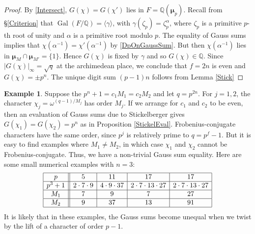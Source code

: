 \documentclass[12pt]{amsart}  \usepackage{amsmath,amssymb,enumerate,amscd,tikz,url}
\numberwithin{equation}{section}
\theoremstyle{definition}
\newtheorem{Ex}[equation]{Example}
\newcommand{\Q}{{\mathbb Q}}
\newcommand{\Mu}{\boldsymbol \mu}
\newcommand{\Gal}{\operatorname{Gal}}
\newcommand{\lr}[1]{{\langle {#1} \rangle}}
\newcommand{\vv}[1]{{\left\vert {#1} \right\vert}}
\begin{document}
\begin{proof}
By \eqref{Intersect}, $G(\chi) = G(\chi')$ lies in $F = \Q(\Mu_p)$.  Recall from \S \ref{Criterion} that $\Gal(F/\Q) =  \lr{\gamma}$, with $\gamma(\zeta_p) = \zeta_p^\alpha$, where $\zeta_p$ is a primitive $p$-th root of unity and $\alpha$ is a primitive root modulo $p$.  The equality of Gauss sums implies that $\chi(\alpha^{-1}) = \chi'(\alpha^{-1})$ by \eqref{DpOnGaussSum}.  But then $\chi(\alpha^{-1})$ lies in $\Mu_M \cap \Mu_{M'} = \{1\}$.  Hence $G(\chi)$ is fixed by $\gamma$ and so $G(\chi) \in \Q$.  Since $\vv{G(\chi)}_\infty = \sqrt{q}$ at the archimedean place, we conclude that $f = 2n$ is even and $G(\chi) = \pm p^n$.  The unique digit sum $(p-1)n$ follows from Lemma \ref{Stick}
\end{proof}

\begin{Ex}
Suppose the $p^n + 1 = c_1 M_1 = c_2 M_2$ and let $q = p^{2n}$.  For $j = 1,2$, the character $\chi_j = \omega^{(q-1)/M_j}$ has order $M_j$.  If we arrange for $c_1$ and $c_2$ to be even, then an evaluation of Gauss sums due to Stickelberger gives $G(\chi_1) = G(\chi_2) = p^n$ as in Proposition \ref{StickelEval}.  Frobenius-conjugate characters have the same order, since $p^j$ is relatively prime to $q = p^f-1$.  But it is easy to find examples where $M_1 \ne M_2$, in which case $\chi_1$ and $\chi_2$ cannot be Frobenius-conjugate.   Thus, we have a non-trivial Gauss sum equality.  Here are some small numerical examples with $n = 3$:
$$
\begin{array}{| c || c | c | c | c |}
\hline
p & 5  & 11 & 17  & 17 \\
\hline
p^3+1 &  2 \cdot 7 \cdot 9 &  4 \cdot 9 \cdot 37 &  2 \cdot 7 \cdot 13 \cdot 27 &  2 \cdot 7 \cdot 13 \cdot 27 \\
\hline
M_1 &  7 & 9 & 7 & 27  \\
\hline
M_2 &   9 & 37 & 13 & 91  \\
\hline
\end{array}
$$
It is likely that in these examples, the Gauss sums become unequal when we twist by the lift of a character of order $p-1$.
\end{Ex} 
 
 \vspace{5 pt}
 
\end{document}
